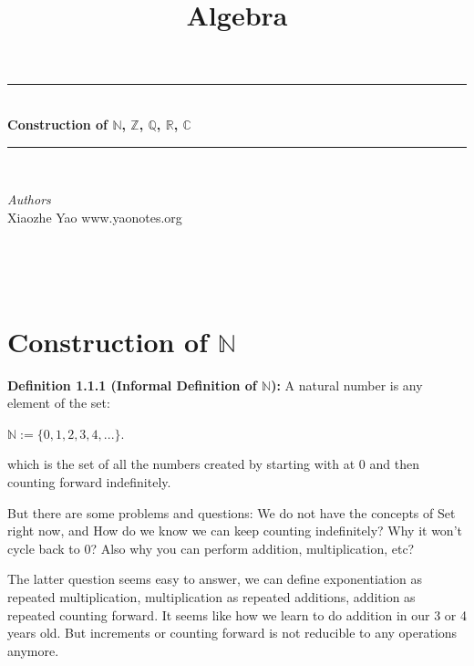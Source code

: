 \documentclass[12pt,openany]{book}
\title{Algebra}
\theoremstyle{definition}
\theoremstyle{definition}
\newcommand{\HRule}{\rule{\linewidth}{0.5mm}} %
\begin{document}
 

\begin{center}
\HRule \\[0.4cm]
{ \huge \bfseries Construction of $\mathbb{N}$, $\mathbb{Z}$, $\mathbb{Q}$, $\mathbb{R}$, $\mathbb{C}$ }\\[0.4cm] %
\HRule \\[1.5cm]
\begin{minipage}{0.4\textwidth}
\begin{flushleft} \large
\emph{Authors}\\
Xiaozhe Yao \newline
www.yaonotes.org \newline

\end{flushleft}
\end{minipage}
~
\begin{minipage}{0.4\textwidth}
\begin{flushright} \large

\end{flushright}
\end{minipage}\\[0.5cm]
\end{center}

\chapter{Construction of $\mathbb{N}$}

\noindent\textbf{Definition 1.1.1 (Informal Definition of $\mathbb{N}$):} A natural number is any element of the set:

$\mathbb{N} := \{0,1,2,3,4,...\}$.

which is the set of all the numbers created by starting with at $0$ and then counting forward indefinitely.

But there are some problems and questions: We do not have the concepts of Set right now, and How do we know we can keep counting indefinitely? Why it won't cycle back to $0$? Also why you can perform addition, multiplication, etc?

The latter question seems easy to answer, we can define exponentiation as repeated multiplication, multiplication as repeated additions, addition as repeated counting forward. It seems like how we learn to do addition in our 3 or 4 years old. But increments or counting forward is not reducible to any operations anymore.
\end{document}
